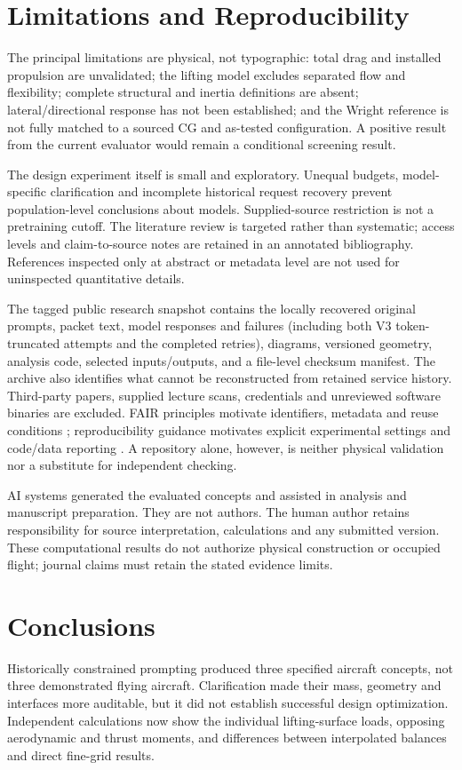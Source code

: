 \documentclass[10pt,letterpaper]{article}
\begin{document}
\section{Limitations and Reproducibility}
The principal limitations are physical, not typographic: total drag and installed propulsion are unvalidated; the lifting model excludes separated flow and flexibility; complete structural and inertia definitions are absent; lateral/directional response has not been established; and the Wright reference is not fully matched to a sourced CG and as-tested configuration. A positive result from the current evaluator would remain a conditional screening result.

The design experiment itself is small and exploratory. Unequal budgets, model-specific clarification and incomplete historical request recovery prevent population-level conclusions about models. Supplied-source restriction is not a pretraining cutoff. The literature review is targeted rather than systematic; access levels and claim-to-source notes are retained in an annotated bibliography. References inspected only at abstract or metadata level are not used for uninspected quantitative details.

The tagged public research snapshot contains the locally recovered original prompts, packet text, model responses and failures (including both V3 token-truncated attempts and the completed retries), diagrams, versioned geometry, analysis code, selected inputs/outputs, and a file-level checksum manifest. The archive also identifies what cannot be reconstructed from retained service history. Third-party papers, supplied lecture scans, credentials and unreviewed software binaries are excluded. FAIR principles motivate identifiers, metadata and reuse conditions \cite{ref33}; reproducibility guidance motivates explicit experimental settings and code/data reporting \cite{ref34}. A repository alone, however, is neither physical validation nor a substitute for independent checking.

AI systems generated the evaluated concepts and assisted in analysis and manuscript preparation. They are not authors. The human author retains responsibility for source interpretation, calculations and any submitted version. These computational results do not authorize physical construction or occupied flight; journal claims must retain the stated evidence limits.

\section{Conclusions}
Historically constrained prompting produced three specified aircraft concepts, not three demonstrated flying aircraft. Clarification made their mass, geometry and interfaces more auditable, but it did not establish successful design optimization. Independent calculations now show the individual lifting-surface loads, opposing aerodynamic and thrust moments, and differences between interpolated balances and direct fine-grid results.
\end{document}
